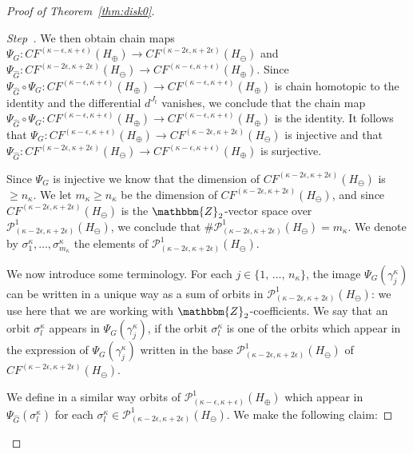 \documentclass[AHL,Unicode,longabstracts,published]{cedram}
\newcommand{\Z}{\mathbbm{Z}}
\newcommand{\clP}{\mathcal{P}}
\newcounter{claim}
\newcounter{stepcount}
\newenvironment{step}{\refstepcounter{stepcount}\begin{proof}[Step~\thestepcount]}{\let\qed\relax\end{proof}}
\begin{document}
\begin{proof}[Proof of Theorem~\ref{thm:disk0}]
\begin{step}
We then obtain chain maps $\Psi_G : CF^{(\kappa - \epsilon, \kappa+ \epsilon)}(H_\oplus) \to CF^{(\kappa - 2\epsilon, \kappa+ 2\epsilon)}(H_\ominus) $ and $\Psi_{\widehat{G}}:CF^{(\kappa - 2\epsilon, \kappa+ 2\epsilon)}(H_\ominus) \to CF^{(\kappa - \epsilon, \kappa+ \epsilon)}(H_\oplus)$. Since $\Psi_{\widehat{G}} \circ \Psi_G: CF^{(\kappa - \epsilon, \kappa+ \epsilon)}(H_\oplus)\to $\linebreak$ CF^{(\kappa - \epsilon, \kappa+ \epsilon)}(H_\oplus) $ is chain homotopic to the identity and the differential $d^{J_t}$ vanishes, we conclude that the chain map $\Psi_{\widehat{G}} \circ \Psi_G: CF^{(\kappa - \epsilon, \kappa+ \epsilon)}(H_\oplus) \to CF^{(\kappa - \epsilon, \kappa+ \epsilon)}(H_\oplus) $ is the identity. It follows that $\Psi_G: CF^{(\kappa - \epsilon, \kappa+ \epsilon)}(H_\oplus) \to CF^{(\kappa - 2\epsilon, \kappa+ 2\epsilon)}(H_\ominus) $ is injective and that $\Psi_{\widehat{G}}: CF^{(\kappa - 2\epsilon, \kappa+ 2\epsilon)}(H_\ominus) \to CF^{(\kappa - \epsilon, \kappa+ \epsilon)}(H_\oplus)$ is surjective.

Since $\Psi_G$ is injective we know that the dimension of $CF^{(\kappa - 2\epsilon, \kappa+ 2\epsilon)}(H_\ominus)$ is $\geq n_\kappa$. We let $m_\kappa \geq n_\kappa$ be the dimension of $CF^{(\kappa - 2\epsilon, \kappa+ 2\epsilon)}(H_\ominus)$, and since $CF^{(\kappa - 2\epsilon, \kappa+ 2\epsilon)}(H_\ominus)$ is the $\Z_2$-vector space over $\clP^1_{(\kappa - 2\epsilon, \kappa+ 2\epsilon)}(H_\ominus)$, we conclude that $ \# \clP^1_{(\kappa - 2\epsilon, \kappa+ 2\epsilon)}(H_\ominus) = m_\kappa$. We denote by $\sigma^\kappa_1,\ldots,\sigma^\kappa_{m_\kappa}$ the elements of $\clP^1_{(\kappa - 2\epsilon, \kappa+ 2\epsilon)}(H_\ominus)$.

We now introduce some terminology. For each $j\in \{1,\,\ldots,\,n_\kappa\}$, the image $\Psi_G(\gamma^\kappa_j)$ can be written in a unique way as a sum of orbits in $\clP^1_{(\kappa - 2\epsilon, \kappa+ 2\epsilon)}(H_\ominus)$: we use here that we are working with $\Z_2$-coefficients. We say that an orbit $\sigma^\kappa_l$ appears in $\Psi_G(\gamma^\kappa_j)$, if the orbit $\sigma^\kappa_l$ is one of the orbits which appear in the expression of $\Psi_G(\gamma^\kappa_j)$ written in the base $\clP^1_{(\kappa - 2\epsilon, \kappa+ 2\epsilon)}(H_\ominus)$ of $CF^{(\kappa - 2\epsilon, \kappa+ 2\epsilon)}(H_\ominus)$.

We define in a similar way orbits of $\clP^1_{(\kappa - \epsilon, \kappa+ \epsilon)}(H_\oplus)$ which appear in $\Psi_{\widehat{G}}(\sigma^\kappa_l)$ for each $\sigma^\kappa_l \in \clP^1_{(\kappa - 2\epsilon, \kappa+ 2\epsilon)}(H_\ominus)$. We make the following claim:


\end{step}
\end{proof}
\end{document}
